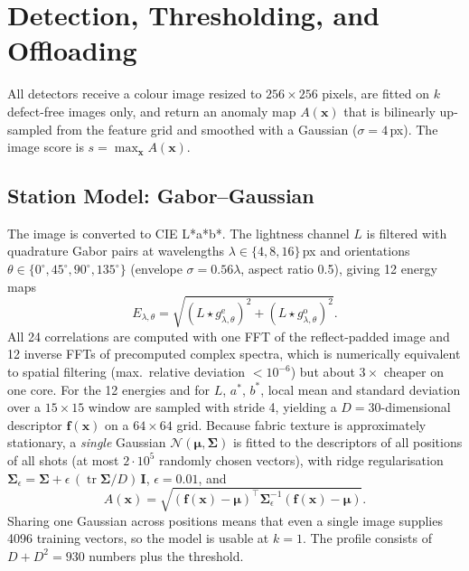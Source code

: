 \section{Detection, Thresholding, and Offloading}\label{sec:methods}

All detectors receive a colour image resized to $256\times256$ pixels, are fitted on $k$ defect-free images only, and return an anomaly map $A(\mathbf{x})$ that is bilinearly up-sampled from the feature grid and smoothed with a Gaussian ($\sigma=4$\,px). The image score is $s=\max_{\mathbf{x}}A(\mathbf{x})$.

\subsection{Station Model: Gabor--Gaussian}\label{sec:gg}
The image is converted to CIE L*a*b*. The lightness channel $L$ is filtered with quadrature Gabor pairs at wavelengths $\lambda\in\{4,8,16\}$\,px and orientations $\theta\in\{0^\circ,45^\circ,90^\circ,135^\circ\}$ (envelope $\sigma=0.56\lambda$, aspect ratio 0.5), giving 12 energy maps
\begin{equation}
E_{\lambda,\theta}=\sqrt{\left(L\star g^{\mathrm{e}}_{\lambda,\theta}\right)^2+\left(L\star g^{\mathrm{o}}_{\lambda,\theta}\right)^2}.
\end{equation}
All 24 correlations are computed with one FFT of the reflect-padded image and 12 inverse FFTs of precomputed complex spectra, which is numerically equivalent to spatial filtering (max.\ relative deviation $<10^{-6}$) but about $3\times$ cheaper on one core. For the 12 energies and for $L$, $a^*$, $b^*$, local mean and standard deviation over a $15\times15$ window are sampled with stride 4, yielding a $D=30$-dimensional descriptor $\mathbf{f}(\mathbf{x})$ on a $64\times64$ grid. Because fabric texture is approximately stationary, a \emph{single} Gaussian $\mathcal{N}(\boldsymbol{\mu},\boldsymbol{\Sigma})$ is fitted to the descriptors of all positions of all shots (at most $2\cdot10^5$ randomly chosen vectors), with ridge regularisation $\boldsymbol{\Sigma}_\epsilon=\boldsymbol{\Sigma}+\epsilon\,(\operatorname{tr}\boldsymbol{\Sigma}/D)\,\mathbf{I}$, $\epsilon=0.01$, and
\begin{equation}
A(\mathbf{x})=\sqrt{(\mathbf{f}(\mathbf{x})-\boldsymbol{\mu})^{\top}\boldsymbol{\Sigma}_\epsilon^{-1}(\mathbf{f}(\mathbf{x})-\boldsymbol{\mu})}.
\end{equation}
Sharing one Gaussian across positions means that even a single image supplies 4096 training vectors, so the model is usable at $k=1$. The profile consists of $D+D^2=930$ numbers plus the threshold.

